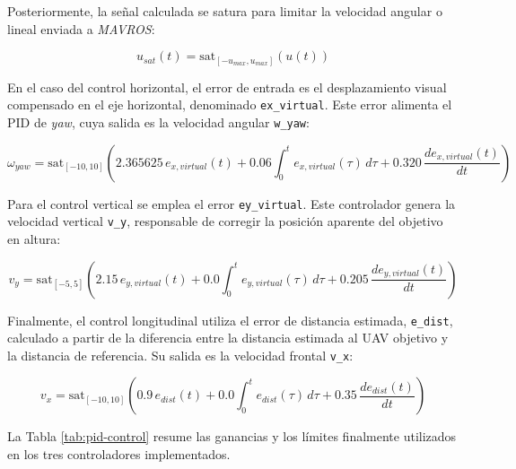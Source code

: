 \vspace{0.3cm}

Posteriormente, la señal calculada se satura para limitar la velocidad angular o lineal enviada a \textit{MAVROS}:

\begin{equation}
u_{sat}(t) = \mathrm{sat}_{[-u_{max},u_{max}]}\left(u(t)\right)
\end{equation}

\vspace{0.3cm}

En el caso del control horizontal, el error de entrada es el desplazamiento visual compensado en el eje horizontal, denominado \texttt{ex\_virtual}. Este error alimenta el PID de \textit{yaw}, cuya salida es la velocidad angular \texttt{w\_yaw}:

\begin{equation}
\omega_{yaw} = \mathrm{sat}_{[-10,10]}\left(
2.365625\,e_{x,virtual}(t)
+ 0.06 \int_0^t e_{x,virtual}(\tau)\,d\tau
+ 0.320\,\frac{de_{x,virtual}(t)}{dt}
\right)
\end{equation}

\vspace{0.3cm}

Para el control vertical se emplea el error \texttt{ey\_virtual}. Este controlador genera la velocidad vertical \texttt{v\_y}, responsable de corregir la posición aparente del objetivo en altura:

\begin{equation}
v_y = \mathrm{sat}_{[-5,5]}\left(
2.15\,e_{y,virtual}(t)
+ 0.0 \int_0^t e_{y,virtual}(\tau)\,d\tau
+ 0.205\,\frac{de_{y,virtual}(t)}{dt}
\right)
\end{equation}

\vspace{0.3cm}

Finalmente, el control longitudinal utiliza el error de distancia estimada, \texttt{e\_dist}, calculado a partir de la diferencia entre la distancia estimada al UAV objetivo y la distancia de referencia. Su salida es la velocidad frontal \texttt{v\_x}:

\begin{equation}
v_x = \mathrm{sat}_{[-10,10]}\left(
0.9\,e_{dist}(t)
+ 0.0 \int_0^t e_{dist}(\tau)\,d\tau
+ 0.35\,\frac{de_{dist}(t)}{dt}
\right)
\end{equation}

\vspace{0.3cm}

La Tabla \ref{tab:pid-control} resume las ganancias y los límites finalmente utilizados en los tres controladores implementados.

